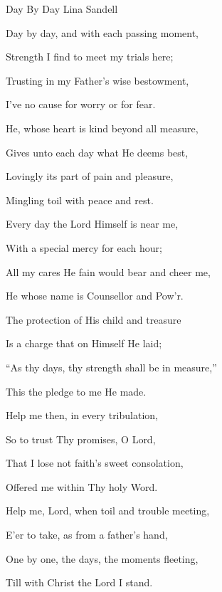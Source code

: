 \documentclass[12pt]{book}
\begin{document}
\begin{song}{Day By Day}{}
  {\SBPubDom}
  {Lina Sandell}
  {}
  {}

  \begin{SBVerse}
    Day by day, and with each passing moment,

    Strength I find to meet my trials here;

    Trusting in my Father's wise bestowment,

    I've no cause for worry or for fear.

    He, whose heart is kind beyond all measure,

    Gives unto each day what He deems best,

    Lovingly its part of pain and pleasure,

    Mingling toil with peace and rest.
  \end{SBVerse}

  \begin{SBVerse}
    Every day the Lord Himself is near me,

    With a special mercy for each hour;

    All my cares He fain would bear and cheer me,

    He whose name is Counsellor and Pow'r.

    The protection of His child and treasure

    Is a charge that on Himself He laid;

    ``As thy days, thy strength shall be in measure,''

    This the pledge to me He made.
  \end{SBVerse}

  \begin{SBVerse}
    Help me then, in every tribulation,

    So to trust Thy promises, O Lord,

    That I lose not faith's sweet consolation,

    Offered me within Thy holy Word.

    Help me, Lord, when toil and trouble meeting,

    E'er to take, as from a father's hand,

    One by one, the days, the moments fleeting,

    Till with Christ the Lord I stand.
  \end{SBVerse}
\end{song}
\end{document}
